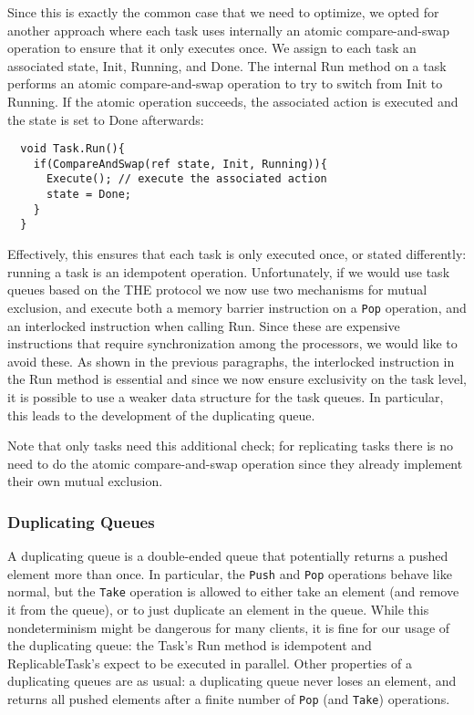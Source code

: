 Since this is exactly the common case that we need to optimize, we
opted for another approach where each task uses internally an atomic
compare-and-swap operation to ensure that it only executes once. We
assign to each task an associated state, Init, Running, and Done. The
internal Run method on a task performs an atomic compare-and-swap
operation to try to switch from Init to Running. If the atomic
operation succeeds, the associated action is executed and the state is
set to Done afterwards:

\begin{lstlisting}
  void Task.Run(){
    if(CompareAndSwap(ref state, Init, Running)){
      Execute(); // execute the associated action
      state = Done;
    }
  }
\end{lstlisting}

Effectively, this ensures that each task is only executed once, or
stated differently: running a task is an idempotent
operation. Unfortunately, if we would use task queues based on the THE
protocol we now use two mechanisms for mutual exclusion, and execute
both a memory barrier instruction on a \lstinline!Pop! operation, and
an interlocked instruction when calling Run. Since these are expensive
instructions that require synchronization among the processors, we
would like to avoid these. As shown in the previous paragraphs, the
interlocked instruction in the Run method is essential and since we
now ensure exclusivity on the task level, it is possible to use a
weaker data structure for the task queues. In particular, this leads
to the development of the duplicating queue.

Note that only tasks need this additional check; for replicating tasks
there is no need to do the atomic compare-and-swap operation since
they already implement their own mutual exclusion.

\subsubsection{Duplicating Queues}

A duplicating queue is a double-ended queue that potentially returns a
pushed element more than once. In particular, the \lstinline!Push! and
\lstinline!Pop! operations behave like normal, but the
\lstinline!Take! operation is allowed to either take an element (and
remove it from the queue), or to just duplicate an element in the
queue. While this nondeterminism might be dangerous for many clients,
it is fine for our usage of the duplicating queue: the Task's Run
method is idempotent and ReplicableTask's expect to be executed in
parallel. Other properties of a duplicating queues are as usual: a
duplicating queue never loses an element, and returns all pushed
elements after a finite number of \lstinline!Pop! (and
\lstinline!Take!) operations.

